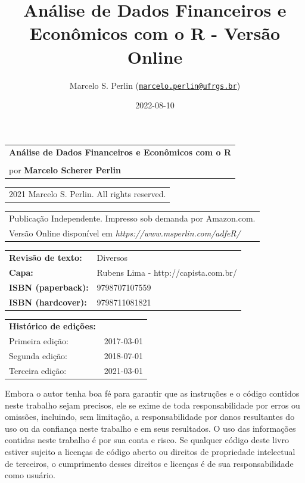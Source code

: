 \documentclass[
  11pt,
]{book}
\title{Análise de Dados Financeiros e Econômicos com o R - Versão Online}
\author{Marcelo S. Perlin (\href{mailto:marcelo.perlin@ufrgs.br}{\nolinkurl{marcelo.perlin@ufrgs.br}})}
\date{2022-08-10}
\begin{document}
\maketitle

\thispagestyle{empty}

\begin{tabular}{@{}l }
	\textbf{Análise de Dados Financeiros e Econômicos com o R}   \\
	{} \\
	por \textbf{Marcelo Scherer Perlin}
\end{tabular}

\vspace{0.75cm}

\begin{tabular}{@{}l }
	{\textcopyright} 2021 Marcelo S. Perlin. All rights reserved.
\end{tabular}

\begin{tabular}{@{}l }
	Publicação Independente. Impresso sob demanda por Amazon.com. \\
	Versão Online disponível em \textit{https://www.msperlin.com/adfeR/}
\end{tabular}


\vspace{0.75cm}

\begin{tabular}{@{} ll}
	\textbf{Revisão de texto:} & Diversos  \\
	\textbf{Capa:} & Rubens Lima - http://capista.com.br/  \\
	\textbf{ISBN (paperback):} & 9798707107559 \\
	\textbf{ISBN (hardcover):} & 9798711081821 \\
\end{tabular}

\vspace{0.5cm}

\begin{tabular}{@{} ll}
	\textbf{Histórico de edições:} &   \\
	  Primeira edição: & 2017-03-01 \\
	  Segunda edição: & 2018-07-01 \\
	  Terceira edição: &  2021-03-01 \\	  
\end{tabular}


\vspace{0.5cm}

Embora o autor tenha boa fé para garantir que as instruções e o código contidos neste trabalho sejam precisos, ele se exime de toda responsabilidade por erros ou omissões, incluindo, sem limitação, a responsabilidade por danos resultantes do uso ou da confiança neste trabalho e em seus resultados. O uso das informações contidas neste trabalho é por sua conta e risco. Se qualquer código deste livro estiver sujeito a licenças de código aberto ou direitos de propriedade intelectual de terceiros, o cumprimento desses direitos e licenças é de sua responsabilidade como usuário.
\end{document}
